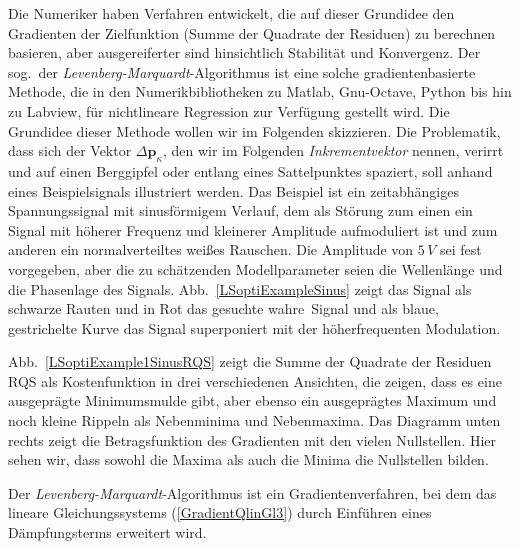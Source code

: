 Die Numeriker haben Verfahren entwickelt, die auf dieser Grundidee den Gradienten
der Zielfunktion (Summe der Quadrate der Residuen) zu berechnen
basieren, aber ausgereiferter sind hinsichtlich Stabilität und Konvergenz.
Der sog.\ der \textsl{Levenberg-Marquardt}-Algorithmus ist eine solche gradientenbasierte Methode,
die in den Numerikbibliotheken zu Matlab, Gnu-Octave, Python bis hin zu Labview, für nichtlineare
Regression zur Verfügung gestellt wird. Die Grundidee dieser Methode wollen wir im Folgenden skizzieren.
Die Problematik, dass sich der Vektor $\Delta \mathbf{p}_{\kappa}$, den wir im
Folgenden \textsl{Inkrementvektor} nennen, verirrt und auf
einen Berggipfel oder entlang eines Sattelpunktes spaziert, soll anhand eines Beispielsignals
illustriert werden. Das Beispiel ist ein zeitabhängiges Spannungssignal mit sinusförmigem Verlauf,
dem als Störung zum einen ein Signal mit höherer Frequenz und kleinerer Amplitude aufmoduliert ist
und zum anderen ein normalverteiltes weißes Rauschen.
Die Amplitude von $5 \, V$ sei fest vorgegeben, aber die zu schätzenden Modellparameter seien
die Wellenlänge und die Phasenlage des Signals. Abb.~\ref{LSoptiExampleSinus} zeigt das Signal als
schwarze Rauten und in Rot das gesuchte \glqq wahre\grqq ~Signal und als blaue, gestrichelte Kurve
das Signal superponiert mit der höherfrequenten Modulation.

Abb.~\ref{LSoptiExample1SinusRQS} zeigt die Summe der Quadrate der Residuen RQS als
Kostenfunktion in drei verschiedenen Ansichten, die zeigen, dass es eine ausgeprägte Minimumsmulde gibt,
aber ebenso ein ausgeprägtes Maximum und noch kleine Rippeln als Nebenminima und Nebenmaxima.
Das Diagramm unten rechts zeigt die Betragsfunktion des Gradienten mit den vielen Nullstellen.
Hier sehen wir, dass sowohl die Maxima als auch die Minima die Nullstellen bilden.

Der \textsl{Levenberg-Marquardt}-Algorithmus ist ein Gradientenverfahren, bei dem das lineare
Gleichungssystems (\ref{GradientQlinGl3}) 
durch Einführen eines Dämpfungsterms erweitert wird. 

